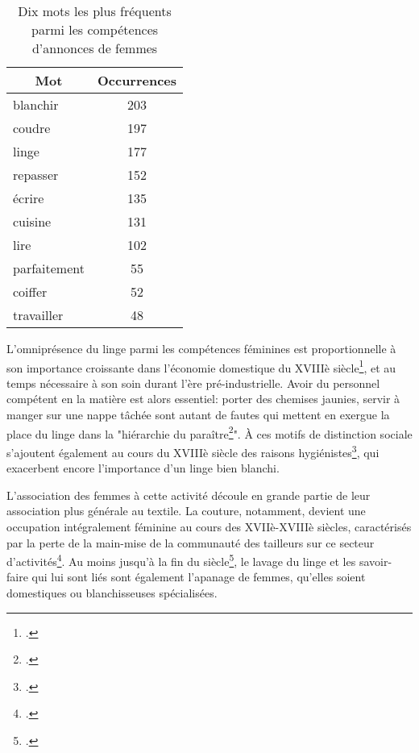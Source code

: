 \begin{table}[ht]
	\centering
	\begin{tabular}{|l|c|}
		\multicolumn{1}{|c|}{\textbf{Mot}} & \textbf{Occurrences} \\ \hline
		blanchir                         & 203                  \\
		coudre                           & 197                  \\
		linge                            & 177                  \\
		repasser                         & 152                  \\
		écrire                           & 135                  \\
		cuisine                          & 131                  \\
		lire                             & 102                  \\
		parfaitement                     & 55                   \\
		coiffer                          & 52                   \\
		travailler                       & 48                  
	\end{tabular}
	\caption{Dix mots les plus fréquents parmi les compétences d'annonces de femmes}
\end{table}

L'omniprésence du linge parmi les compétences féminines est proportionnelle à son importance croissante dans l'économie domestique du XVIIIè siècle\footcites{rocheInventionLingeAu1986}, et au temps nécessaire à son soin durant l'ère pré-industrielle. Avoir du personnel compétent en la matière est alors essentiel: porter des chemises jaunies, servir à manger sur une nappe tâchée sont autant de fautes qui mettent en exergue la place du linge dans la "hiérarchie du paraître\footcites[p.236]{rocheInventionLingeAu1986}". À ces motifs de distinction sociale s'ajoutent également au cours du XVIIIè siècle des raisons hygiénistes\footcites{ungererValeursUrbainesPropre1986}, qui exacerbent encore l'importance d'un linge bien blanchi.

L'association des femmes à cette activité découle en grande partie de leur association plus générale au textile. La couture, notamment, devient une occupation intégralement féminine au cours des XVIIè-XVIIIè siècles, caractérisés par la perte de la main-mise de la communauté des tailleurs sur ce secteur d'activités\footcites{crowstonFabricatingWomenSeamstresses2001}{crowstonEngenderingGuildsSeamstresses2000}. Au moins jusqu'à la fin du siècle\footcites{moreraBlanchisseusesPropreBlanchisseurs2018}, le lavage du linge et les savoir-faire qui lui sont liés sont également l'apanage de femmes, qu'elles soient domestiques ou blanchisseuses spécialisées.

